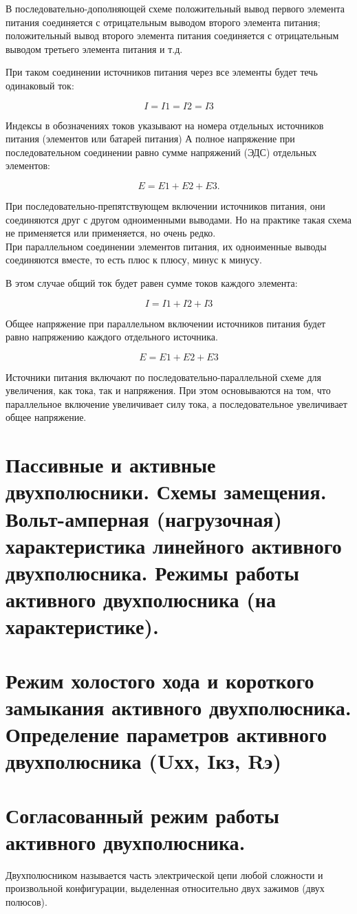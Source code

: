 \documentclass[a4paper, 12pt]{article}
\begin{document}
В последовательно-дополняющей схеме положительный вывод первого элемента питания соединяется с отрицательным выводом второго элемента питания; положительный вывод второго элемента питания соединяется с отрицательным выводом третьего элемента питания и т.д.

При таком соединении источников питания через все элементы будет течь одинаковый ток:

\[
    I=I1=I2=I3    
\] 

Индексы в обозначениях токов указывают на номера отдельных источников питания (элементов или батарей питания)
А полное напряжение при последовательном соединении равно сумме напряжений (ЭДС) отдельных элементов:

\[
    E = E1 + E2 + E3.    
\] 

При последовательно-препятствующем включении источников питания, они соединяются друг с другом одноименными выводами. Но на практике такая схема не применяется или применяется, но очень редко.\\

При параллельном соединении элементов питания, их одноименные выводы соединяются вместе, то есть плюс к плюсу, минус к минусу.

В этом случае общий ток будет равен сумме токов каждого элемента:

\[
    I=I1+I2+I3
\]

Общее напряжение при параллельном включении источников питания будет равно напряжению каждого отдельного источника.

\[
       E = E1 + E2 + E3
\]

Источники питания включают по последовательно-параллельной схеме для увеличения, как тока, так и напряжения. При этом основываются на том, что параллельное включение увеличивает силу тока, а последовательное увеличивает общее напряжение.
\section{Пассивные и активные двухполюсники. Схемы замещения. Вольт-амперная (нагрузочная) характеристика линейного активного двухполюсника. Режимы работы активного двухполюсника (на характеристике).}
\section{Режим холостого хода и короткого замыкания активного двухполюсника. Определение параметров активного двухполюсника (Uхх, Iкз, Rэ)}
\section{Согласованный режим работы активного двухполюсника.}
Двухполюсником называется часть электрической цепи любой сложности и произвольной конфигурации, выделенная относительно двух зажимов (двух полюсов).
\end{document}
